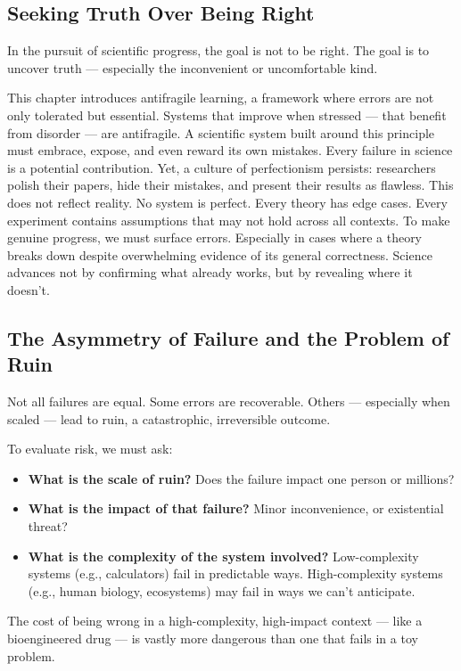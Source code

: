 \documentclass{article}
\begin{document}
\subsection{Seeking Truth Over Being Right}

In the pursuit of scientific progress, the goal is not to be right. The goal is to uncover truth — especially the inconvenient or uncomfortable kind.

This chapter introduces antifragile learning, a framework where errors are not only tolerated but essential. Systems that improve when stressed — that benefit from disorder — are antifragile. A scientific system built around this principle must embrace, expose, and even reward its own mistakes. Every failure in science is a potential contribution. Yet, a culture of perfectionism persists: researchers polish their papers, hide their mistakes, and present their results as flawless. This does not reflect reality. No system is perfect. Every theory has edge cases. Every experiment contains assumptions that may not hold across all contexts. To make genuine progress, we must surface errors. Especially in cases where a theory breaks down despite overwhelming evidence of its general correctness. Science advances not by confirming what already works, but by revealing where it doesn't.

\subsection{The Asymmetry of Failure and the Problem of Ruin}

Not all failures are equal. Some errors are recoverable. Others — especially when scaled — lead to ruin, a catastrophic, irreversible outcome.

To evaluate risk, we must ask:

\begin{itemize}
	\item \textbf{What is the scale of ruin?} Does the failure impact one person or millions?
	\item \textbf{What is the impact of that failure?} Minor inconvenience, or existential threat?
	\item \textbf{What is the complexity of the system involved?} Low-complexity systems (e.g., calculators) fail in predictable ways. High-complexity systems (e.g., human biology, ecosystems) may fail in ways we can’t anticipate.
\end{itemize}

The cost of being wrong in a high-complexity, high-impact context — like a bioengineered drug — is vastly more dangerous than one that fails in a toy problem. 
\end{document}
